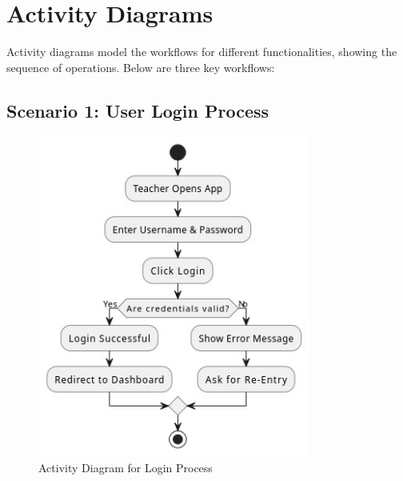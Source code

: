 \section{Activity Diagrams}
Activity diagrams model the workflows for different functionalities, showing the sequence of operations. Below are three key workflows:

\subsection{Scenario 1: User Login Process}
\begin{figure}[H]
    \centering
    \includegraphics[width=0.8\textwidth]{Graphics/activity_diagram_teacher_login.jpg}
    \caption{Activity Diagram for Login Process}
    \label{fig:activity_diagram_login}
\end{figure}

